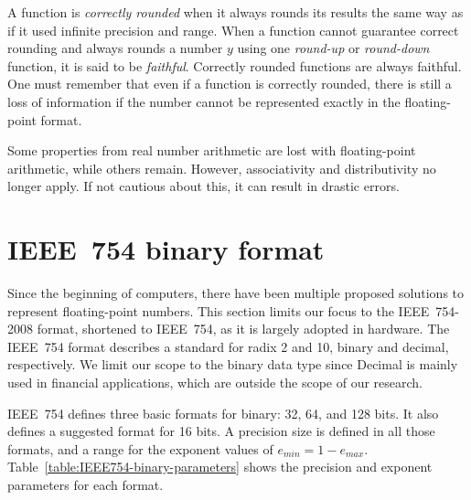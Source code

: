 A function is \textit{correctly rounded} when it always rounds its results the 
same way as if it used infinite precision and range.
When a function cannot guarantee correct rounding and always rounds a number $y$
using one \textit{round-up} or \textit{round-down} function, it is said to be \textit{faithful}.
Correctly rounded functions are always faithful.
One must remember that even if a function is correctly rounded, there is
still a loss of information if the number cannot be represented exactly in the
floating-point format.

Some properties from real number arithmetic are lost with floating-point arithmetic, while others remain.
However, associativity and distributivity no longer apply.
If not cautious about this, it can result in drastic errors.
	
						
\section{IEEE~754 binary format}
\label{sc:ieee754}
Since the beginning of computers, there have been multiple proposed solutions to represent floating-point numbers.
This section limits our focus to the IEEE~754-2008 format, shortened to IEEE~754, as it is largely adopted in hardware.
The IEEE~754 format describes a standard for radix 2 and 10, binary and decimal, respectively.
We limit our scope to the binary data type since Decimal is mainly used in financial applications, which are outside the scope of our research.
						
IEEE~754 defines three basic formats for binary: 32, 64, and 128 bits.
It also defines a suggested format for 16 bits.
A precision size is defined in all those formats, and a range for the exponent values of $e_{min} = 1 - e_{max}$.
Table~\ref{table:IEEE754-binary-parameters} shows the precision and exponent parameters for each format. 
						
